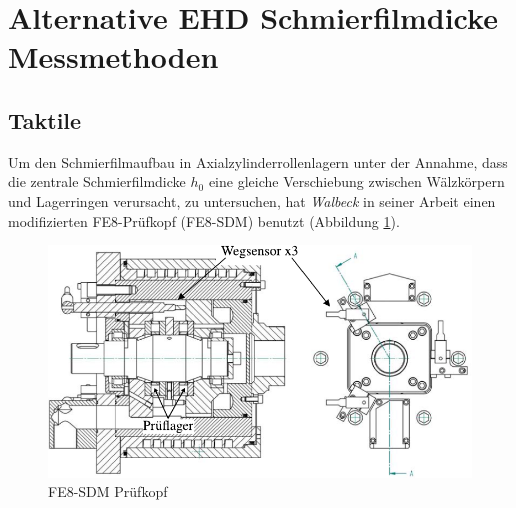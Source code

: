 \section{Alternative EHD Schmierfilmdicke Messmethoden}
\label{sec:alternative_messmethoden}

\subsection{Taktile}
\label{sub:taktil}

Um den Schmierfilmaufbau in Axialzylinderrollenlagern unter der Annahme, dass die zentrale Schmierfilmdicke $h_0$ eine gleiche Verschiebung zwischen Wälzkörpern und Lagerringen verursacht, zu untersuchen, hat \textit{Walbeck} in seiner Arbeit \cite{Walbeck_2004} einen modifizierten FE8-Prüfkopf (FE8-SDM) benutzt (Abbildung \ref{fig:fe8_sdm_walbeck}).
\begin{figure}[htb]
    \centering
    \includegraphics[]{./images/fe8_sdm_walbeck.pdf}
    \caption{FE8-SDM Prüfkopf \cite{Walbeck_2004}}
    \label{fig:fe8_sdm_walbeck}
\end{figure}
%

